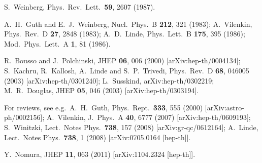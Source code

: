 \documentclass[12pt]{article}
\begin{document}
\begin{thebibliography}{99}
\raggedright

S.~Weinberg,
Phys.\ Rev.\ Lett.\ {\bf 59}, 2607 (1987).

A.~H.~Guth and E.~J.~Weinberg,
Nucl.\ Phys.\ B {\bf 212}, 321 (1983);
A.~Vilenkin,
Phys.\ Rev.\ D {\bf 27}, 2848 (1983);
A.~D.~Linde,
Phys.\ Lett.\ B {\bf 175}, 395 (1986);
Mod.\ Phys.\ Lett.\ A {\bf 1}, 81 (1986).

R.~Bousso and J.~Polchinski,
JHEP {\bf 06}, 006 (2000)
[arXiv:hep-th/0004134];
S.~Kachru, R.~Kallosh, A.~Linde and S.~P.~Trivedi,
Phys.\ Rev.\ D {\bf 68}, 046005 (2003)
[arXiv:hep-th/0301240];
L.~Susskind,
arXiv:hep-th/0302219;
M.~R.~Douglas,
JHEP {\bf 05}, 046 (2003)
[arXiv:hep-th/0303194].

For reviews, see e.g.\
A.~H.~Guth,
Phys.\ Rept.\ {\bf 333}, 555 (2000)
[arXiv:astro-ph/0002156];
A.~Vilenkin,
J.\ Phys.\ A {\bf 40}, 6777 (2007)
[arXiv:hep-th/0609193];
S.~Winitzki,
Lect.\ Notes Phys.\ {\bf 738}, 157 (2008)
[arXiv:gr-qc/0612164];
A.~Linde,
Lect.\ Notes Phys.\ {\bf 738}, 1 (2008)
[arXiv:0705.0164 [hep-th]].

Y.~Nomura,
JHEP {\bf 11}, 063 (2011)
[arXiv:1104.2324 [hep-th]].


\end{thebibliography}
\end{document}

